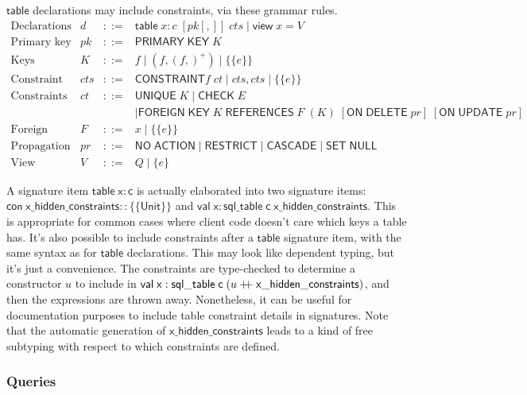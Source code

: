 \documentclass{article}
\newcommand{\mt}[1]{\mathsf{#1}}
\newcommand{\rc}{+ \hspace{-.075in} + \;}
\begin{document}
$\mt{table}$ declarations may include constraints, via these grammar rules.
$$\begin{array}{rrcll}
  \textrm{Declarations} & d &::=& \mt{table} \; x : c \; [pk[,]] \; cts \mid \mt{view} \; x = V \\
  \textrm{Primary key constraints} & pk &::=& \mt{PRIMARY} \; \mt{KEY} \; K \\
  \textrm{Keys} & K &::=& f \mid (f, (f,)^+) \mid \{\{e\}\} \\
  \textrm{Constraint sets} & cts &::=& \mt{CONSTRAINT} f \; ct \mid cts, cts \mid \{\{e\}\} \\
  \textrm{Constraints} & ct &::=& \mt{UNIQUE} \; K \mid \mt{CHECK} \; E \\
  &&& \mid \mt{FOREIGN} \; \mt{KEY} \; K \; \mt{REFERENCES} \; F \; (K) \; [\mt{ON} \; \mt{DELETE} \; pr] \; [\mt{ON} \; \mt{UPDATE} \; pr] \\
  \textrm{Foreign tables} & F &::=& x \mid \{\{e\}\} \\
  \textrm{Propagation modes} & pr &::=& \mt{NO} \; \mt{ACTION} \mid \mt{RESTRICT} \mid \mt{CASCADE} \mid \mt{SET} \; \mt{NULL} \\
  \textrm{View expressions} & V &::=& Q \mid \{e\}
\end{array}$$

A signature item $\mt{table} \; \mt{x} : \mt{c}$ is actually elaborated into two signature items: $\mt{con} \; \mt{x\_hidden\_constraints} :: \{\{\mt{Unit}\}\}$ and $\mt{val} \; \mt{x} : \mt{sql\_table} \; \mt{c} \; \mt{x\_hidden\_constraints}$.  This is appropriate for common cases where client code doesn't care which keys a table has.  It's also possible to include constraints after a $\mt{table}$ signature item, with the same syntax as for $\mt{table}$ declarations.  This may look like dependent typing, but it's just a convenience.  The constraints are type-checked to determine a constructor $u$ to include in $\mt{val} \; \mt{x} : \mt{sql\_table} \; \mt{c} \; (u \rc \mt{x\_hidden\_constraints})$, and then the expressions are thrown away.  Nonetheless, it can be useful for documentation purposes to include table constraint details in signatures.  Note that the automatic generation of $\mt{x\_hidden\_constraints}$ leads to a kind of free subtyping with respect to which constraints are defined.


\subsubsection{Queries}
\end{document}

